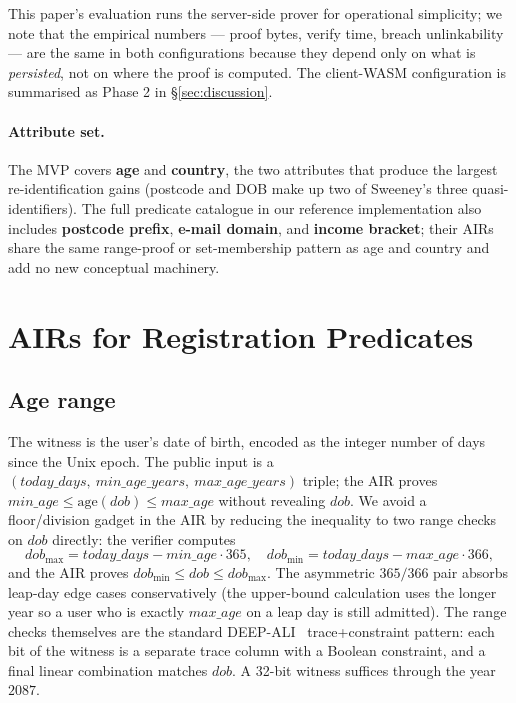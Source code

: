\documentclass[11pt,a4paper]{article}
\begin{document}
This paper's evaluation runs the server\nobreakdash-side prover for
operational simplicity; we note that the empirical numbers — proof
bytes, verify time, breach unlinkability — are the same in both
configurations because they depend only on what is \emph{persisted},
not on where the proof is computed.  The client\nobreakdash-WASM
configuration is summarised as Phase 2 in
\S\ref{sec:discussion}.

\paragraph{Attribute set.}  The MVP covers \textbf{age} and
\textbf{country}, the two attributes that produce the largest
re\nobreakdash-identification gains (postcode and DOB make up two of
Sweeney's three quasi\nobreakdash-identifiers).  The full predicate
catalogue in our reference implementation also includes
\textbf{postcode prefix}, \textbf{e-mail domain}, and
\textbf{income bracket}; their AIRs share the same range\nobreakdash-proof
or set\nobreakdash-membership pattern as age and country and add no
new conceptual machinery.

\section{AIRs for Registration Predicates}
\label{sec:airs}

\subsection{Age range}
\label{sec:air-age}

The witness is the user's date of birth, encoded as the integer
number of days since the Unix epoch.  The public input is a
$(\mathit{today\_days},\ \mathit{min\_age\_years},\ \mathit{max\_age\_years})$
triple; the AIR proves
$\mathit{min\_age} \leq \mathrm{age}(\mathit{dob}) \leq \mathit{max\_age}$
without revealing $\mathit{dob}$.  We avoid a floor/division gadget
in the AIR by reducing the inequality to two range checks on
$\mathit{dob}$ directly: the verifier computes
\[
  \mathit{dob}_\mathrm{max} = \mathit{today\_days}
                              - \mathit{min\_age} \cdot 365, \quad
  \mathit{dob}_\mathrm{min} = \mathit{today\_days}
                              - \mathit{max\_age} \cdot 366,
\]
and the AIR proves $\mathit{dob}_\mathrm{min} \leq \mathit{dob}
\leq \mathit{dob}_\mathrm{max}$.  The asymmetric $365/366$ pair
absorbs leap\nobreakdash-day edge cases conservatively (the
upper\nobreakdash-bound calculation uses the longer year so a user
who is exactly $\mathit{max\_age}$ on a leap day is still admitted).
The range checks themselves are the standard
DEEP\nobreakdash-ALI~\cite{stark-stir}
trace+constraint pattern: each bit of the witness is a separate
trace column with a Boolean constraint, and a final linear
combination matches $\mathit{dob}$.  A 32\nobreakdash-bit witness
suffices through the year $2087$.
\end{document}
